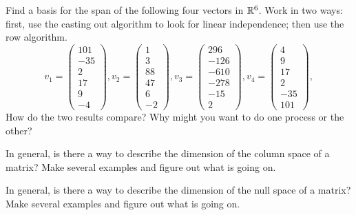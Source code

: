 \documentclass[elementsmain.tex]{subfiles}
\begin{document}
\begin{exercise} Find a basis for the span of the following four vectors in $\mathbb{R}^6$. Work in two ways: first, use the casting out algorithm to look for linear independence; then use the row algorithm. 
\[
v_1 = \begin{pmatrix} 101 \\   -35 \\    2 \\   17 \\   9 \\ -4 \end{pmatrix}, 
v_2 = \begin{pmatrix}   1 \\     3 \\   88 \\   47 \\   6 \\ -2 \end{pmatrix}, 
v_3 = \begin{pmatrix}  296 \\ -126 \\ -610 \\ -278 \\ -15 \\  2 \end{pmatrix}, 
v_4 = \begin{pmatrix} 4 \\ 9 \\ 17 \\ 2 \\ -35 \\ 101 \end{pmatrix}, 
\]
How do the two results compare? Why might you want to do one process or the other?
\end{exercise}

\begin{exercise} In general, is there a way to describe the dimension of the column space of a matrix? Make several examples and figure out what is going on.
\end{exercise}

\begin{exercise} In general, is there a way to describe the dimension of the null space of a matrix? Make several examples and figure out what is going on.
\end{exercise}

\clearpage
\end{document}
